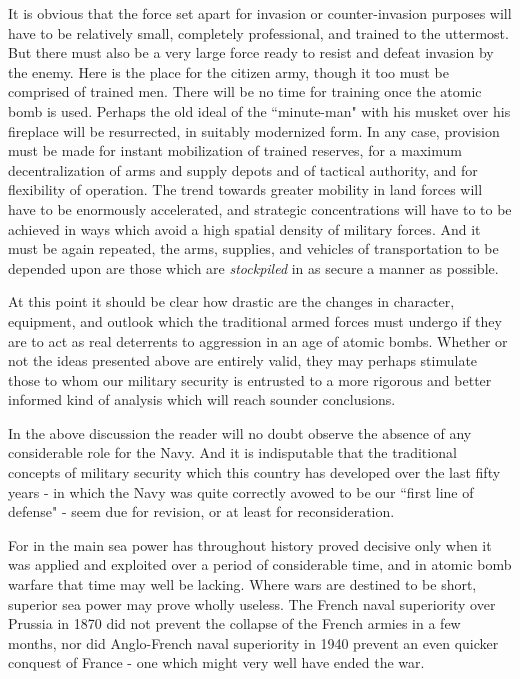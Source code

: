 It is obvious that the force set apart for invasion or counter-invasion purposes will have to be relatively small, completely professional, and trained to the uttermost. But there must also be a very large force ready to resist and defeat invasion by the enemy. Here is the place for the citizen army, though it too must be comprised of trained men. There will be no time for training once the atomic bomb is used. Perhaps the old ideal of the ``minute-man" with his musket over his fireplace will be resurrected, in suitably modernized form. In any case, provision must be made for instant mobilization of trained reserves, for a maximum decentralization of arms and supply depots and of tactical authority, and for flexibility of operation. The trend towards greater mobility in land forces will have to be enormously accelerated, and strategic concentrations will have to to be achieved in ways which avoid a high spatial density of military forces. And it must be again repeated, the arms, supplies, and vehicles of transportation to be depended upon are those which are \emph{stockpiled} in as secure a manner as possible.

At this point it should be clear how drastic are the changes in character, equipment, and outlook which the traditional armed forces must undergo if they are to act as real deterrents to aggression in an age of atomic bombs. Whether or not the ideas presented above are entirely valid, they may perhaps stimulate those to whom our military security is entrusted to a more rigorous and better informed kind of analysis which will reach sounder conclusions.

In the above discussion the reader will no doubt observe the absence of any considerable role for the Navy. And it is indisputable that the traditional concepts of military security which this country has developed over the last fifty years - in which the Navy was quite correctly avowed to be our ``first line of defense" - seem due for revision, or at least for reconsideration.

For in the main sea power has throughout history proved decisive only when it was applied and exploited over a period of considerable time, and in atomic bomb warfare that time may well be lacking. Where wars are destined to be short, superior sea power may prove wholly useless. The French naval superiority over Prussia in 1870 did not prevent the collapse of the French armies in a few months, nor did Anglo-French naval superiority in 1940 prevent an even quicker conquest of France - one which might very well have ended the war.

